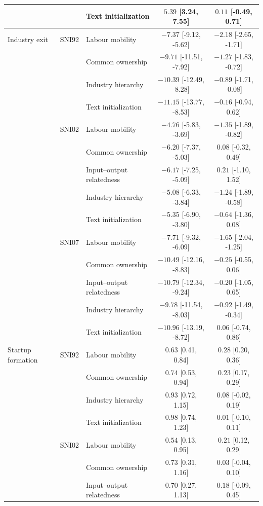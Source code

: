 \documentclass[9pt,twoside]{pnas-new}
\begin{document}
\begin{table}[H]
\begin{tabular}{lllcc}
 &  & Text initialization & $5.39$ [3.24, 7.55] & $0.11$ [-0.49, 0.71] \\
\midrule
Industry exit & SNI92 & Labour mobility & $-7.37$ [-9.12, -5.62] & $-2.18$ [-2.65, -1.71] \\
 &  & Common ownership & $-9.71$ [-11.51, -7.92] & $-1.27$ [-1.83, -0.72] \\
 &  & Industry hierarchy & $-10.39$ [-12.49, -8.28] & $-0.89$ [-1.71, -0.08] \\
 &  & Text initialization & $-11.15$ [-13.77, -8.53] & $-0.16$ [-0.94, 0.62] \\
\addlinespace[2pt]
 & SNI02 & Labour mobility & $-4.76$ [-5.83, -3.69] & $-1.35$ [-1.89, -0.82] \\
 &  & Common ownership & $-6.20$ [-7.37, -5.03] & $0.08$ [-0.32, 0.49] \\
 &  & Input--output relatedness & $-6.17$ [-7.25, -5.09] & $0.21$ [-1.10, 1.52] \\
 &  & Industry hierarchy & $-5.08$ [-6.33, -3.84] & $-1.24$ [-1.89, -0.58] \\
 &  & Text initialization & $-5.35$ [-6.90, -3.80] & $-0.64$ [-1.36, 0.08] \\
\addlinespace[2pt]
 & SNI07 & Labour mobility & $-7.71$ [-9.32, -6.09] & $-1.65$ [-2.04, -1.25] \\
 &  & Common ownership & $-10.49$ [-12.16, -8.83] & $-0.25$ [-0.55, 0.06] \\
 &  & Input--output relatedness & $-10.79$ [-12.34, -9.24] & $-0.20$ [-1.05, 0.65] \\
 &  & Industry hierarchy & $-9.78$ [-11.54, -8.03] & $-0.92$ [-1.49, -0.34] \\
 &  & Text initialization & $-10.96$ [-13.19, -8.72] & $0.06$ [-0.74, 0.86] \\
\midrule
Startup formation & SNI92 & Labour mobility & $0.63$ [0.41, 0.84] & $0.28$ [0.20, 0.36] \\
 &  & Common ownership & $0.74$ [0.53, 0.94] & $0.23$ [0.17, 0.29] \\
 &  & Industry hierarchy & $0.93$ [0.72, 1.15] & $0.08$ [-0.02, 0.19] \\
 &  & Text initialization & $0.98$ [0.74, 1.23] & $0.01$ [-0.10, 0.11] \\
\addlinespace[2pt]
 & SNI02 & Labour mobility & $0.54$ [0.13, 0.95] & $0.21$ [0.12, 0.29] \\
 &  & Common ownership & $0.73$ [0.31, 1.16] & $0.03$ [-0.04, 0.10] \\
 &  & Input--output relatedness & $0.70$ [0.27, 1.13] & $0.18$ [-0.09, 0.45] \\

\end{tabular}
\end{table}
\end{document}
